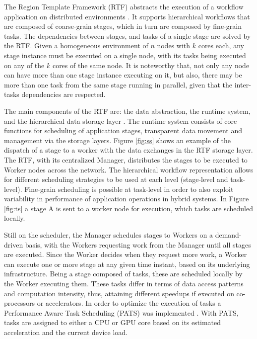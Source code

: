 The Region Template Framework (RTF) abstracts the execution of a workflow application on distributed environments \cite{rtf1}. It supports hierarchical workflows that are composed of coarse-grain stages, which in turn are composed by fine-grain tasks. The dependencies between stages, and tasks of a single stage are solved by the RTF. Given a homogeneous environment of $n$ nodes with $k$ cores each, any stage instance must be executed on a single node, with its tasks being executed on any of the $k$ cores of the same node. It is noteworthy that, not only any node can have more than one stage instance executing on it, but also, there may be  more than one task from the same stage running in parallel, given that the inter-tasks dependencies are respected.

The main components of the RTF are: the data abstraction, the runtime system, and the hierarchical data storage layer \cite{rtf1}. The runtime system consists of core functions for scheduling of application stages, transparent data movement and management via the storage layers. Figure \ref{fig:ss} shows an example of the dispatch of a stage to a worker with the data exchanges in the RTF storage layer. The RTF, with its centralized Manager, distributes the stages to be executed to Worker nodes across the network. The hierarchical workflow representation allows for different scheduling strategies to be used at each level (stage-level and task-level). Fine-grain scheduling is possible at task-level in order to also exploit variability in performance of application operations in hybrid systems. In Figure \ref{fig:ts} a stage A is sent to a worker node for execution, which tasks are scheduled locally. 

Still on the scheduler, the Manager schedules stages to Workers on a
demand-driven basis, with the Workers requesting work from the Manager until
all stages are executed. Since the Worker decides when they request more work,
a Worker can execute one or more stage at any given time instant, based on its
underlying infrastructure. Being a stage composed of tasks, these are scheduled
locally by the Worker executing them. These tasks differ in terms of data
access patterns and computation intensity, thus, attaining different speedups
if executed on co-processors or accelerators. In order to optimize the
execution of tasks a Performance Aware Task Scheduling (PATS) was implemented
\cite{rtf1,Teodoro-IPDPS2013,Teodoro:2014:CPA:2650283.2650645,cluster09george,CPE:CPE4425,doi:10.1177/1094342015594519,DBLP:journals/pc/TeodoroPKKCS13}.
With PATS, tasks are assigned to either a CPU or GPU core based on its
estimated acceleration and the current device load.

